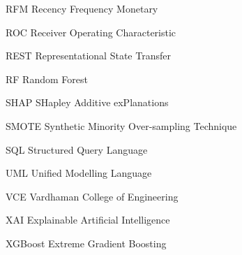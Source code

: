 \begin{abbrv}
\item[RFM]   \hspace{2cm} Recency Frequency Monetary
\item[ROC]   \hspace{2cm} Receiver Operating Characteristic
\item[REST]  \hspace{2cm} Representational State Transfer
\item[RF]    \hspace{2cm} Random Forest
\item[SHAP]  \hspace{2cm} SHapley Additive exPlanations
\item[SMOTE] \hspace{2cm} Synthetic Minority Over-sampling Technique
\item[SQL]   \hspace{2cm} Structured Query Language
\item[UML]   \hspace{2cm} Unified Modelling Language
\item[VCE]   \hspace{2cm} Vardhaman College of Engineering
\item[XAI]   \hspace{2cm} Explainable Artificial Intelligence
\item[XGBoost] \hspace{2cm} Extreme Gradient Boosting

\end{abbrv}